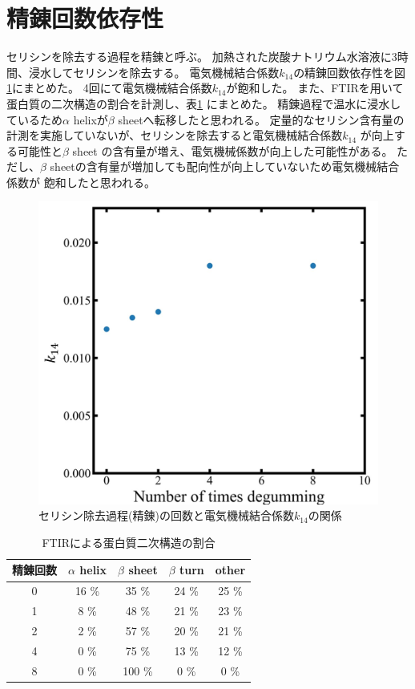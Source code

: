 \documentclass[dvipdfmx,12pt,a4paper]{jreport}
\begin{document}
			\section{精錬回数依存性}
			セリシンを除去する過程を精錬と呼ぶ。
			加熱された炭酸ナトリウム水溶液に3時間、浸水してセリシンを除去する。
			電気機械結合係数$k_{14}$の精錬回数依存性を図\ref{times_k}にまとめた。
			4回にて電気機械結合係数$k_{14}$が飽和した。
			また、FTIRを用いて蛋白質の二次構造の割合を計測し、表\ref{FTIR_蛋白質二次構造_セリシン除去回数}
			にまとめた。
			精錬過程で温水に浸水しているため$\alpha$ helixが$\beta$ sheetへ転移したと思われる。
			定量的なセリシン含有量の計測を実施していないが、セリシンを除去すると電気機械結合係数$k_{14}$
			が向上する可能性と$\beta$ sheet の含有量が増え、電気機械係数が向上した可能性がある。
			ただし、$\beta$ sheetの含有量が増加しても配向性が向上していないため電気機械結合係数が
			飽和したと思われる。
			\begin{figure}[h]
				\centering
				\includegraphics[scale=0.5]{number_k.jpg}
				\caption{セリシン除去過程(精錬)の回数と電気機械結合係数$k_{14}$の関係}
				\label{times_k}
			\end{figure}
			\begin{table}[h]
				\centering
				\caption{FTIRによる蛋白質二次構造の割合}
				\label{FTIR_蛋白質二次構造_セリシン除去回数}
				\begin{tabular}{c c c c c} \hline
					精錬回数 & $\alpha$ helix & $\beta$ sheet &$\beta$ turn & other \\ \hline \hline
					0 & 16 \% & 35 \% &  24 \% & 25 \% \\
					1 & 8 \% & 48 \% &  21 \% & 23 \% \\
					2 &  2 \% & 57 \% & 20 \% & 21 \% \\
					4 & 0 \% & 75 \% & 13 \% & 12 \% \\ 
					8 & 0 \% & 100 \% & 0 \% & 0 \% \\ \hline
				\end{tabular}
			\end{table}
			\newpage
\end{document}
